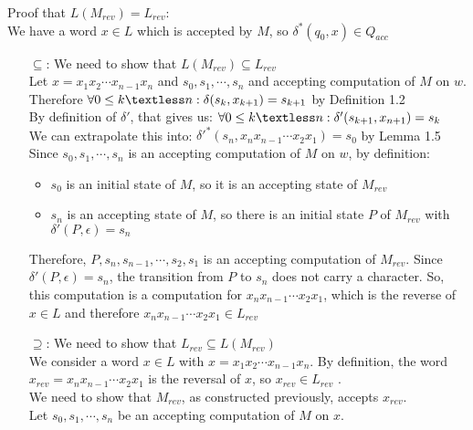 Proof that $L(M_{rev}) = L_{rev}$:\\
We have a word $x\in L$ which is accepted by $M$, so $\delta^{*}(q_{0},x)\in Q_{acc}$
\begin{itemize}
    \item[$\subseteq$:] We need to show that $L(M_{rev})\subseteq L_{rev}$\\
    Let $x=x_{1}x_{2}\cdots x_{n-1}x_{n}$ and $s_{0},s_{1},\cdots,s_{n}$ and accepting computation of $M$ on $w$.\\
    Therefore $\forall 0 \leq k \textless n: \delta(s_{k},x_{k+1})=s_{k+1}$  by Definition 1.2\\
    By definition of $\delta'$, that gives us: $\forall 0 \leq k \textless n: \delta'(s_{k+1}, x_{n+1}) = s_{k}$\\
    We can extrapolate this into: $\delta'^{*}(s_{n}, x_{n}x_{n-1}\cdots x_{2}x_{1}) = s_{0}$ by Lemma 1.5\\
    Since $s_{0},s_{1},\cdots,s_{n}$ is an accepting computation of $M$ on $w$, by definition:
    \begin{itemize}
        \item $s_{0}$ is an initial state of $M$, so it is an accepting state of $M_{rev}$
        \item $s_{n}$ is an accepting state of $M$, so there is an initial state $P$ of $M_{rev}$ with $\delta'(P,\epsilon)=s_{n}$
    \end{itemize}
    Therefore, $P,s_{n},s_{n-1},\cdots, s_{2},s_{1}$ is an accepting computation of $M_{rev}$. Since $\delta'(P,\epsilon)=s_{n}$, the transition from $P$ to $s_{n}$ does not carry a character. So, this computation is a computation for $x_{n}x_{n-1}\cdots x_{2}x_{1}$, which is the reverse of $x \in L$ and therefore $x_{n}x_{n-1}\cdots x_{2}x_{1} \in L_{rev}$
    \item[$\supseteq$:] We need to show that $L_{rev}\subseteq L(M_{rev})$\\
    We consider a word $x \in L$ with $x=x_{1}x_{2}\cdots x_{n-1}x_{n}$. By definition, the word $x_{rev} = x_{n}x_{n-1}\cdots x_{2}x_{1}$ is the reversal of $x$, so $x_{rev} \in L_{rev}$ .\\
    We need to show that $M_{rev}$, as constructed previously, accepts $x_{rev}$.\\
    Let $s_{0}, s_{1},\cdots,s_{n}$ be an accepting computation of $M$ on $x$.\\

\end{itemize}
